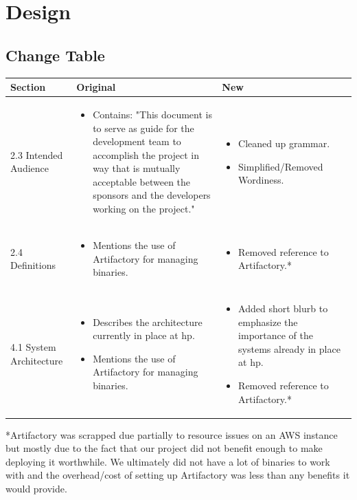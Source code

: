 \documentclass[onecolumn, draftclsnofoot,10pt, compsoc]{IEEEtran}
\begin{document}
\clearpage

\section{Design}

\subsection{Change Table}
  
\begin{longtable}{ | m{8em} | m{24em}| m{16em}| } 
\hline
Section&
Original&
New
\\ \hline

2.3 Intended Audience&
\begin{itemize}
  \item Contains: "This document is to serve as guide for the development team to accomplish the project in way that is mutually acceptable between the sponsors and the developers working on the project."
\end{itemize}&
\begin{itemize}
  \item Cleaned up grammar.
  \item Simplified/Removed Wordiness.
\end{itemize}
\\
\hline
2.4 Definitions&
\begin{itemize}
  \item Mentions the use of Artifactory for managing binaries.
\end{itemize}&
\begin{itemize}
  \item Removed reference to Artifactory.*
\end{itemize}
\\
\hline
4.1 System Architecture&
\begin{itemize}
  \item Describes the architecture currently in place at hp.
  \item Mentions the use of Artifactory for managing binaries.
\end{itemize}&
\begin{itemize}
  \item Added short blurb to emphasize the importance of the systems already in place at hp.
  \item Removed reference to Artifactory.*
\end{itemize}
\\
\hline
\end{longtable}
*Artifactory was scrapped due partially to resource issues on an AWS instance but mostly due to the fact that our project did not benefit enough to make deploying it worthwhile.
We ultimately did not have a lot of binaries to work with and the overhead/cost of setting up Artifactory was less than any benefits it would provide.
\end{document}
